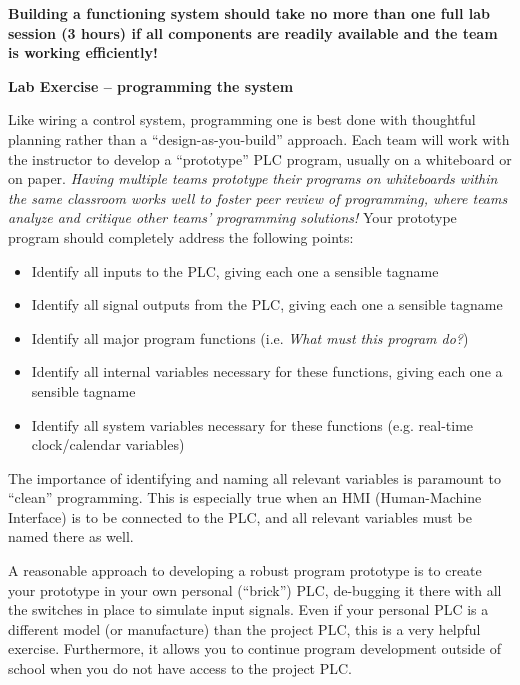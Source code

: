 \vskip 10pt

{\bf Building a functioning system should take no more than one full lab session (3 hours) if all components are readily available and the team is working efficiently!}




\vfil \eject

\noindent
{\bf Lab Exercise -- programming the system}

\vskip 5pt

Like wiring a control system, programming one is best done with thoughtful planning rather than a ``design-as-you-build'' approach.  Each team will work with the instructor to develop a ``prototype'' PLC program, usually on a whiteboard or on paper.  {\it Having multiple teams prototype their programs on whiteboards within the same classroom works well to foster peer review of programming, where teams analyze and critique other teams' programming solutions!}  Your prototype program should completely address the following points:

\begin{itemize}
\item{} Identify all inputs to the PLC, giving each one a sensible tagname
\item{} Identify all signal outputs from the PLC, giving each one a sensible tagname
\item{} Identify all major program functions (i.e. {\it What must this program do?})
\item{} Identify all internal variables necessary for these functions, giving each one a sensible tagname
\item{} Identify all system variables necessary for these functions (e.g. real-time clock/calendar variables)
\end{itemize}

The importance of identifying and naming all relevant variables is paramount to ``clean'' programming.  This is especially true when an HMI (Human-Machine Interface) is to be connected to the PLC, and all relevant variables must be named there as well.

A reasonable approach to developing a robust program prototype is to create your prototype in your own personal (``brick'') PLC, de-bugging it there with all the switches in place to simulate input signals.  Even if your personal PLC is a different model (or manufacture) than the project PLC, this is a very helpful exercise.  Furthermore, it allows you to continue program development outside of school when you do not have access to the project PLC.

